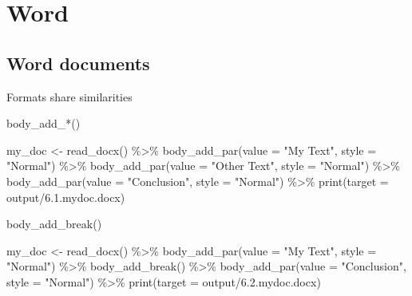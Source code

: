 \documentclass[
]{book}
\newenvironment{Shaded}{\begin{snugshade}}{\end{snugshade}}
\newcommand{\AttributeTok}[1]{\textcolor[rgb]{0.77,0.63,0.00}{#1}}
\newcommand{\FunctionTok}[1]{\textcolor[rgb]{0.00,0.00,0.00}{#1}}
\newcommand{\NormalTok}[1]{#1}
\newcommand{\OtherTok}[1]{\textcolor[rgb]{0.56,0.35,0.01}{#1}}
\newcommand{\SpecialCharTok}[1]{\textcolor[rgb]{0.00,0.00,0.00}{#1}}
\newcommand{\StringTok}[1]{\textcolor[rgb]{0.31,0.60,0.02}{#1}}
\begin{document}
\hypertarget{word}{%
\section{Word}\label{word}}

\hypertarget{word-documents}{%
\subsection{Word documents}\label{word-documents}}

Formats share similarities

body\_add\_*()

\begin{Shaded}
\begin{Highlighting}[]
\NormalTok{my\_doc }\OtherTok{\textless{}{-}} \FunctionTok{read\_docx}\NormalTok{() }\SpecialCharTok{\%\textgreater{}\%} 
  \FunctionTok{body\_add\_par}\NormalTok{(}\AttributeTok{value =} \StringTok{"My Text"}\NormalTok{, }\AttributeTok{style =} \StringTok{"Normal"}\NormalTok{) }\SpecialCharTok{\%\textgreater{}\%}
  \FunctionTok{body\_add\_par}\NormalTok{(}\AttributeTok{value =} \StringTok{"Other Text"}\NormalTok{, }\AttributeTok{style =} \StringTok{"Normal"}\NormalTok{) }\SpecialCharTok{\%\textgreater{}\%} 
  \FunctionTok{body\_add\_par}\NormalTok{(}\AttributeTok{value =} \StringTok{"Conclusion"}\NormalTok{, }\AttributeTok{style =} \StringTok{"Normal"}\NormalTok{) }\SpecialCharTok{\%\textgreater{}\%} 
  \FunctionTok{print}\NormalTok{(}\AttributeTok{target =} \StringTok{\textquotesingle{}output/6.1.mydoc.docx\textquotesingle{}}\NormalTok{)}
\end{Highlighting}
\end{Shaded}

body\_add\_break()

\begin{Shaded}
\begin{Highlighting}[]
\NormalTok{my\_doc }\OtherTok{\textless{}{-}} \FunctionTok{read\_docx}\NormalTok{() }\SpecialCharTok{\%\textgreater{}\%} 
  \FunctionTok{body\_add\_par}\NormalTok{(}\AttributeTok{value =} \StringTok{"My Text"}\NormalTok{, }\AttributeTok{style =} \StringTok{"Normal"}\NormalTok{) }\SpecialCharTok{\%\textgreater{}\%}
  \FunctionTok{body\_add\_break}\NormalTok{() }\SpecialCharTok{\%\textgreater{}\%} 
  \FunctionTok{body\_add\_par}\NormalTok{(}\AttributeTok{value =} \StringTok{"Conclusion"}\NormalTok{, }\AttributeTok{style =} \StringTok{"Normal"}\NormalTok{) }\SpecialCharTok{\%\textgreater{}\%} 
  \FunctionTok{print}\NormalTok{(}\AttributeTok{target =} \StringTok{\textquotesingle{}output/6.2.mydoc.docx\textquotesingle{}}\NormalTok{)}
\end{Highlighting}
\end{Shaded}
\end{document}
